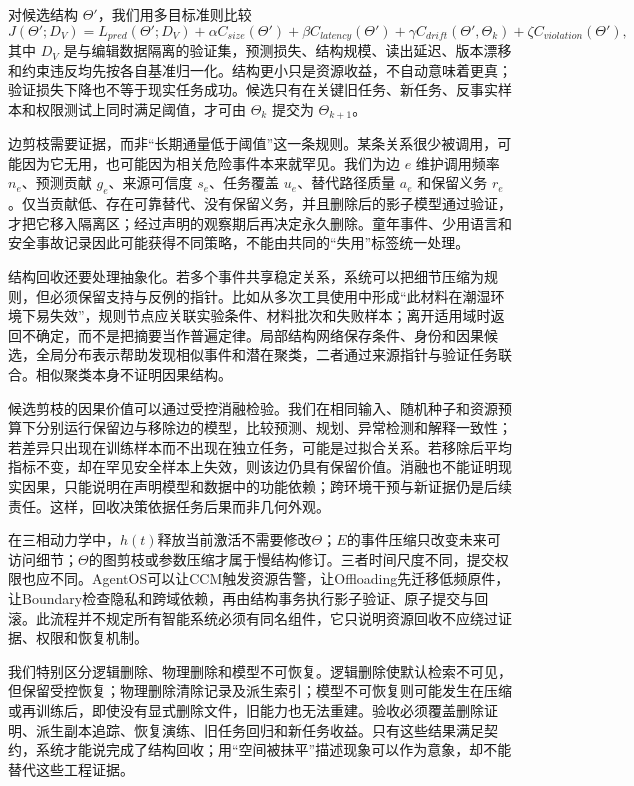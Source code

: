 对候选结构 $\Theta'$，我们用多目标准则比较
\[
J(\Theta';D_V)=L_{pred}(\Theta';D_V)
+\alpha C_{size}(\Theta')
+\beta C_{latency}(\Theta')
+\gamma C_{drift}(\Theta',\Theta_k)
+\zeta C_{violation}(\Theta'),
\]
其中 $D_V$ 是与编辑数据隔离的验证集，预测损失、结构规模、读出延迟、版本漂移和约束违反均先按各自基准归一化。结构更小只是资源收益，不自动意味着更真；验证损失下降也不等于现实任务成功。候选只有在关键旧任务、新任务、反事实样本和权限测试上同时满足阈值，才可由 $\Theta_k$ 提交为 $\Theta_{k+1}$。

边剪枝需要证据，而非“长期通量低于阈值”这一条规则。某条关系很少被调用，可能因为它无用，也可能因为相关危险事件本来就罕见。我们为边 $e$ 维护调用频率 $n_e$、预测贡献 $g_e$、来源可信度 $s_e$、任务覆盖 $u_e$、替代路径质量 $a_e$ 和保留义务 $r_e$。仅当贡献低、存在可靠替代、没有保留义务，并且删除后的影子模型通过验证，才把它移入隔离区；经过声明的观察期后再决定永久删除。童年事件、少用语言和安全事故记录因此可能获得不同策略，不能由共同的“失用”标签统一处理。

结构回收还要处理抽象化。若多个事件共享稳定关系，系统可以把细节压缩为规则，但必须保留支持与反例的指针。比如从多次工具使用中形成“此材料在潮湿环境下易失效”，规则节点应关联实验条件、材料批次和失败样本；离开适用域时返回不确定，而不是把摘要当作普遍定律。局部结构网络保存条件、身份和因果候选，全局分布表示帮助发现相似事件和潜在聚类，二者通过来源指针与验证任务联合。相似聚类本身不证明因果结构。

候选剪枝的因果价值可以通过受控消融检验。我们在相同输入、随机种子和资源预算下分别运行保留边与移除边的模型，比较预测、规划、异常检测和解释一致性；若差异只出现在训练样本而不出现在独立任务，可能是过拟合关系。若移除后平均指标不变，却在罕见安全样本上失效，则该边仍具有保留价值。消融也不能证明现实因果，只能说明在声明模型和数据中的功能依赖；跨环境干预与新证据仍是后续责任。这样，回收决策依据任务后果而非几何外观。

在三相动力学中，$h(t)$释放当前激活不需要修改$\Theta$；$E$的事件压缩只改变未来可访问细节；$\Theta$的图剪枝或参数压缩才属于慢结构修订。三者时间尺度不同，提交权限也应不同。AgentOS可以让CCM触发资源告警，让Offloading先迁移低频原件，让Boundary检查隐私和跨域依赖，再由结构事务执行影子验证、原子提交与回滚。此流程并不规定所有智能系统必须有同名组件，它只说明资源回收不应绕过证据、权限和恢复机制。

我们特别区分逻辑删除、物理删除和模型不可恢复。逻辑删除使默认检索不可见，但保留受控恢复；物理删除清除记录及派生索引；模型不可恢复则可能发生在压缩或再训练后，即使没有显式删除文件，旧能力也无法重建。验收必须覆盖删除证明、派生副本追踪、恢复演练、旧任务回归和新任务收益。只有这些结果满足契约，系统才能说完成了结构回收；用“空间被抹平”描述现象可以作为意象，却不能替代这些工程证据。

